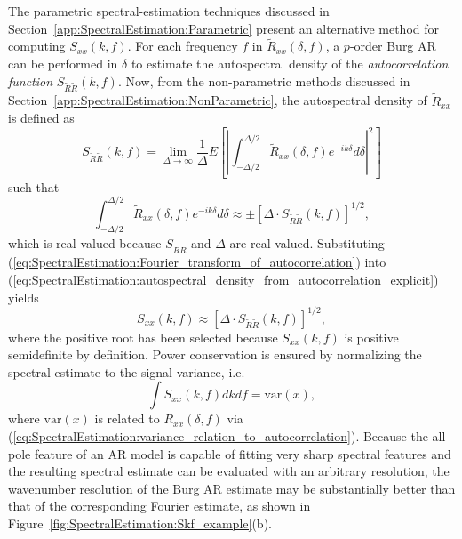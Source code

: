 The parametric spectral-estimation techniques discussed in
Section~\ref{app:SpectralEstimation:Parametric}
present an alternative method for computing $S_{xx}(k, f)$.
For each frequency $f$ in $\tilde{R}_{xx}(\delta, f)$,
a $p$-order Burg AR can be performed in $\delta$
to estimate the autospectral density
of the \emph{autocorrelation function} $S_{\tilde{R}\tilde{R}}(k, f)$.
Now, from the non-parametric methods discussed in
Section~\ref{app:SpectralEstimation:NonParametric},
the autospectral density of $\tilde{R}_{xx}$ is defined as
\begin{equation}
  S_{\tilde{R}\tilde{R}}(k, f)
  =
  \lim_{\Delta \rightarrow \infty}
  \frac{1}{\Delta}
  E\left[%
    \left|
      \int_{-\Delta / 2}^{\Delta / 2}
      \tilde{R}_{xx}(\delta, f)
      e^{-i k \delta} d\delta
    \right|^2
  \right]
\end{equation}
such that
\begin{equation}
  \int_{-\Delta / 2}^{\Delta / 2}
  \tilde{R}_{xx}(\delta, f)
  e^{-i k \delta} d\delta
  \approx
  \pm \left[ \Delta \cdot S_{\tilde{R}\tilde{R}}(k, f) \right]^{1 / 2},
  \label{eq:SpectralEstimation:Fourier_transform_of_autocorrelation}
\end{equation}
which is real-valued because $S_{\tilde{R}\tilde{R}}$ and $\Delta$
are real-valued.
Substituting (\ref{eq:SpectralEstimation:Fourier_transform_of_autocorrelation})
into (\ref{eq:SpectralEstimation:autospectral_density_from_autocorrelation_explicit})
yields
\begin{equation}
  S_{xx}(k, f)
  \approx
  \left[
    \Delta
    \cdot
    S_{\tilde{R}\tilde{R}}(k, f)
  \right]^{1 / 2},
  \label{eq:SpectralEstimation:autospectral_density_Burg}
\end{equation}
where the positive root has been selected
because $S_{xx}(k, f)$ is positive semidefinite by definition.
Power conservation is ensured by normalizing
the spectral estimate to the signal variance, i.e.\
\begin{equation}
  \int S_{xx}(k, f) dk df
  =
  \text{var}(x),
\end{equation}
where $\text{var}(x)$ is related to $R_{xx}(\delta, f)$ via
(\ref{eq:SpectralEstimation:variance_relation_to_autocorrelation}).
Because the all-pole feature of an AR model
is capable of fitting very sharp spectral features
and the resulting spectral estimate can be evaluated
with an arbitrary resolution,
the wavenumber resolution of the Burg AR estimate
may be substantially better than that of the corresponding Fourier estimate,
as shown in Figure~\ref{fig:SpectralEstimation:Skf_example}(b).

